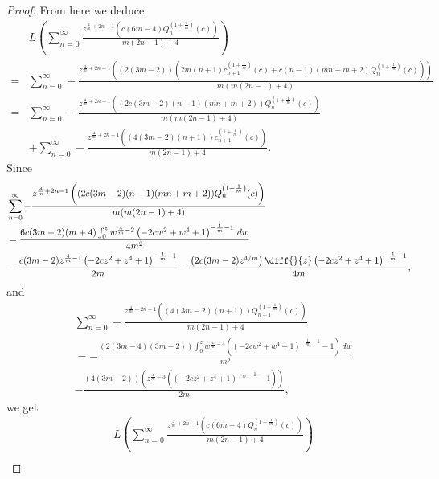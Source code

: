\documentclass[review,nopreprintline]{elsarticle}
\theoremstyle{definition}
\numberwithin{equation}{section}
\theoremstyle{remark}
\begin{document}
\begin{proof}
	        From here we deduce
	        \begin{align*}
	            &L \left(\sum _{n=0}^{\infty } \frac{z^{\frac{4}{m}+2 n-1} \left(c (6 m-4) Q_n^{\left(1+\frac{1}{m}\right)}(c)\right)}{m (2 n-1)+4}\right)\\
	            =&\sum _{n=0}^{\infty } -\frac{z^{\frac{4}{m}+2 n-1} \left((2 (3 m-2)) \left(2 m (n+1) c_{n+1}^{\left(1+\frac{1}{m}\right)}(c)+c (n-1) (m n+m+2) Q_n^{\left(1+\frac{1}{m}\right)}(c)\right)\right)}{m (m (2 n-1)+4)}\\
	            =&\sum _{n=0}^{\infty } -\frac{z^{\frac{4}{m}+2 n-1} \left((2 c (3 m-2) (n-1) (m n+m+2)) Q_n^{\left(1+\frac{1}{m}\right)}(c)\right)}{m (m (2 n-1)+4)}\\
	             &+\sum _{n=0}^{\infty } -\frac{z^{\frac{4}{m}+2 n-1} \left((4 (3 m-2) (n+1)) c_{n+1}^{\left(1+\frac{1}{m}\right)}(c)\right)}{m (2 n-1)+4}.
	        \end{align*}
	        Since
	        \begin{align*}
	            &\sum _{n=0}^{\infty } -\frac{z^{\frac{4}{m}+2 n-1} \left((2 c (3 m-2) (n-1) (m n+m+2)) Q_n^{\left(1+\frac{1}{m}\right)}(c)\right)}{m (m (2 n-1)+4)}\\
	            &=\frac{6 c (3 m-2) (m+4) \int_{0}^z w^{\frac{4}{m}-2} \left(-2 c w^2+w^4+1\right)^{-\frac{1}{m}-1} \, dw}{4 m^2}\\
	            &-\frac{c (3 m-2) z^{\frac{4}{m}-1} \left(-2 c z^2+z^4+1\right)^{-\frac{1}{m}-1}}{2 m}-\frac{\left(2 c (3 m-2) z^{4/m}\right) \diff{}{z}\left(-2 c z^2+z^4+1\right)^{-\frac{1}{m}-1}}{4 m},
	        \end{align*}
	        and
	        \begin{align*}
	            &\sum _{n=0}^{\infty } -\frac{z^{\frac{4}{m}+2 n-1} \left((4 (3 m-2) (n+1)) Q_{n+1}^{\left(1+\frac{1}{m}\right)}(c)\right)}{m (2 n-1)+4}\\
	            &=-\frac{(2 (3 m-4) (3 m-2)) \int_{0}^z w^{\frac{4}{m}-4} \left(\left(-2 c w^2+w^4+1\right)^{-\frac{1}{m}-1}-1\right) \, dw}{m^2}\\
	            &-\frac{(4 (3 m-2)) \left(z^{\frac{4}{m}-3} \left(\left(-2 c z^2+z^4+1\right)^{-\frac{1}{m}-1}-1\right)\right)}{2 m},
	        \end{align*}
	        we get
	        \begin{align*}
	            &L \left(\sum _{n=0}^{\infty } \frac{z^{\frac{4}{m}+2 n-1} \left(c (6 m-4) Q_n^{\left(1+\frac{1}{m}\right)}(c)\right)}{m (2 n-1)+4}\right)\\

\end{align*}
\end{proof}
\end{document}
